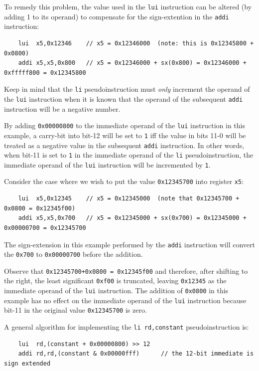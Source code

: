 To remedy this problem, the value used in the \texttt{lui} instruction can be altered
(by adding 1 to its operand) to compensate for the sign-extention in the \texttt{addi}
instruction:
{\small
\begin{verbatim}
    lui  x5,0x12346    // x5 = 0x12346000  (note: this is 0x12345800 + 0x0800)
    addi x5,x5,0x800   // x5 = 0x12346000 + sx(0x800) = 0x12346000 + 0xfffff800 = 0x12345800
\end{verbatim}
}

Keep in mind that the \texttt{li} pseudoinstruction must {\em only} increment the operand
of the \texttt{lui} instruction when it is known that the operand of the subsequent
\texttt{addi} instruction will be a negative number.

%
By adding \texttt{0x00000800} to the immediate operand of the \texttt{lui} instruction in
this example, a carry-bit into bit-12 will be set to \texttt{1} iff the value in
bits 11-0 will be treated as a negative value in the subsequent \texttt{addi} instruction.
In other words, when bit-11 is set to \texttt{1} in the immediate operand of the \texttt{li}
pseudoinstruction, the immediate operand of the \texttt{lui} instruction will be
incremented by \texttt{1}.

Consider the case where we wish to put the value \texttt{0x12345700} into register \texttt{x5}:
{\small
\begin{verbatim}
    lui  x5,0x12345    // x5 = 0x12345000  (note that 0x12345700 + 0x0800 = 0x12345f00)
    addi x5,x5,0x700   // x5 = 0x12345000 + sx(0x700) = 0x12345000 + 0x00000700 = 0x12345700
\end{verbatim}
}
The sign-extension in this example performed by the \texttt{addi} instruction will convert the
\texttt{0x700} to \texttt{0x00000700} before the addition.

Observe that \texttt{0x12345700+0x0800 = 0x12345f00} and therefore, after shifting
to the right, the least significant \texttt{0xf00} is truncated, leaving \texttt{0x12345} as
the immediate operand of the \texttt{lui} instruction.  The addition of
\texttt{0x0800} in this example has no effect on the immediate operand of the \texttt{lui}
instruction because bit-11 in the original value \texttt{0x12345700} is zero.

A general algorithm for implementing the \texttt{li rd,constant} pseudoinstruction is:

{\small
\begin{verbatim}
    lui  rd,(constant + 0x00000800) >> 12
    addi rd,rd,(constant & 0x00000fff)		// the 12-bit immediate is sign extended
\end{verbatim}
}

